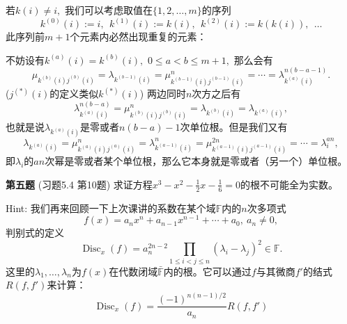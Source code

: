 若$k(i) \neq i,$ 我们可以考虑取值在$\{ 1, 2, \ldots, m \}$的序列
$$k^{(0)}(i) := i, ~~ k^{(1)}(i) := k(i), ~~ k^{(2)}(i) := k(k(i)), ~~ \ldots$$
此序列前$m+1$个元素内必然出现重复的元素：
\begin{figure}[H]
\centering
{}
\end{figure}
不妨设有$k^{(a)}(i) = k^{(b)}(i),$ $0 \leqslant a < b \leqslant m+1,$ 那么会有
$$\mu_{k^{(b)}(i)j^{(b)}(i)} = \lambda_{k^{(b-1)}(i)} = \mu_{k^{(b-1)}(i)j^{(b-1)}(i)}^n = \cdots = \lambda_{k^{(a)}(i)}^{n(b-a-1)}.$$
($j^{(*)}(i)$的定义类似$k^{(*)}(i)$) 两边同时$n$次方之后有
$$\lambda_{k^{(a)}(i)}^{n(b-a)} = \mu_{k^{(b)}(i)j^{(b)}(i)}^n = \lambda_{k^{(b)}(i)} = \lambda_{k^{(a)}(i)},$$
也就是说$\lambda_{k^{(a)}(i)}$是零或者$n(b-a) - 1$次单位根。但是我们又有
$$\lambda_{k^{(a)}(i)} = \mu_{k^{(a)}(i)j^{(a)}(i)}^n = \lambda_{k^{(a-1)}(i)}^n = \mu_{k^{(a-1)}(i)j^{(a-1)}(i)}^{2n} = \cdots = \lambda_{i}^{an},$$
即$\lambda_{i}$的$an$次幂是零或者某个单位根，那么它本身就是零或者（另一个）单位根。

\fi  %

\newpageorvspace

{\bf 第五题} (习题5.4 第10题) 求证方程$x^3 - x^2 - \frac{1}{2}x - \frac{1}{6} = 0$的根不可能全为实数。

\vspace{0.5em}

Hint: 我们再来回顾一下上次课讲的系数在某个域$\mathbb{F}$内的$n$次多项式
$$
f(x) = a_{n}x^{n} + a_{n-1}x^{n-1} + \cdots + a_{0}, ~ a_n \neq 0,
$$
判别式的定义
$$\operatorname{Disc}_x(f) = a_n^{2n-2} \prod_{1 \leqslant i < j \leqslant n} (\lambda_i - \lambda_j)^2 \in \mathbb{F}.$$
这里的$\lambda_1, \ldots, \lambda_n$为$f(x)$在代数闭域$\bar{\mathbb{F}}$内的根。它可以通过$f$与其微商$f'$的结式$R(f,f')$来计算：
$$\operatorname{Disc}_x(f) = \frac{(-1)^{n(n-1)/2}}{a_n} R(f,f')$$

